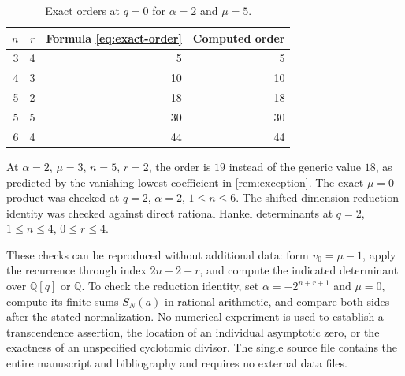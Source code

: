 \documentclass[11pt]{article}
\numberwithin{equation}{section}
\theoremstyle{definition}
\theoremstyle{remark}
\newcommand{\Q}{\mathbb{Q}}
\begin{document}
\begin{table}[ht]
\centering
\caption{Exact orders at $q=0$ for $\alpha=2$ and $\mu=5$.}
\label{tab:checks}
\begin{tabular}{@{}rrrr@{}}
\toprule
$n$&$r$&Formula \eqref{eq:exact-order}&Computed order\\
\midrule
3&4&5&5\\
4&3&10&10\\
5&2&18&18\\
5&5&30&30\\
6&4&44&44\\
\bottomrule
\end{tabular}
\end{table}
\FloatBarrier

At $\alpha=2$, $\mu=3$, $n=5$, $r=2$, the order is $19$ instead of
the generic value $18$, as predicted by the vanishing lowest coefficient
in \cref{rem:exception}. The exact $\mu=0$ product was checked at
$q=2$, $\alpha=2$, $1\le n\le6$. The shifted dimension-reduction
identity was checked against direct rational Hankel determinants at
$q=2$, $1\le n\le4$, $0\le r\le4$.

These checks can be reproduced without additional data: form $v_0=\mu-1$,
apply the recurrence through index $2n-2+r$, and compute the indicated
determinant over $\Q[q]$ or $\Q$. To check the reduction identity, set
$\alpha=-2^{n+r+1}$ and $\mu=0$, compute its finite sums $S_N(a)$ in
rational arithmetic, and compare both sides after the stated normalization.
No numerical experiment is used to establish a transcendence assertion,
the location of an individual asymptotic zero, or the exactness of an
unspecified cyclotomic divisor. The single source file contains the entire
manuscript and bibliography and requires no external data files.
\end{document}
